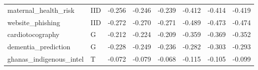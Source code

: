 \begin{longtable}{@{}p{3.95cm}lrrrrrr@{}}
maternal\_\allowbreak{}health\_\allowbreak{}risk & IID & -0.256 & -0.246 & -0.239 & -0.412 & -0.414 & -0.419\\
website\_\allowbreak{}phishing & IID & -0.272 & -0.270 & -0.271 & -0.489 & -0.473 & -0.474\\
cardiotocography & G & -0.212 & -0.224 & -0.209 & -0.359 & -0.369 & -0.352\\
dementia\_\allowbreak{}prediction & G & -0.228 & -0.249 & -0.236 & -0.282 & -0.303 & -0.293\\
ghanas\_\allowbreak{}indigenous\_\allowbreak{}intel & T & -0.072 & -0.079 & -0.068 & -0.115 & -0.105 & -0.099\\
\end{longtable}\endgroup
\begingroup\footnotesize\setlength{\tabcolsep}{3pt}\renewcommand{\arraystretch}{1.15}
\setlength\LTleft{0pt}\setlength\LTright{0pt}
